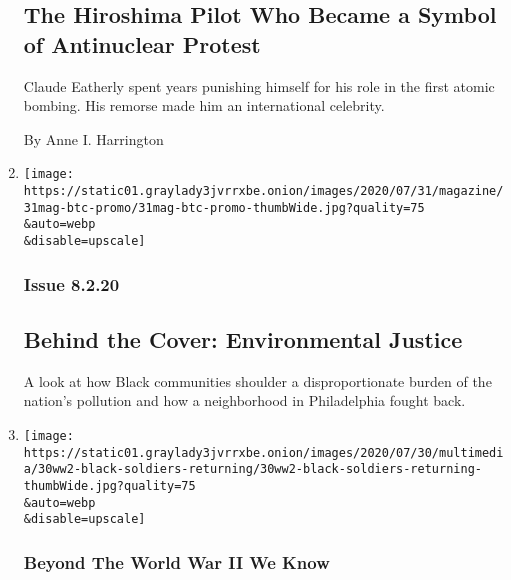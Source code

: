 \begin{enumerate}
  \hypertarget{the-hiroshima-pilot-who-became-a-symbol-of-antinuclear-protest}{%
  \subsection{The Hiroshima Pilot Who Became a Symbol of Antinuclear
  Protest}\label{the-hiroshima-pilot-who-became-a-symbol-of-antinuclear-protest}}

  Claude Eatherly spent years punishing himself for his role in the
  first atomic bombing. His remorse made him an international celebrity.

  By Anne I. Harrington
\item
  \href{/2020/07/31/magazine/behind-the-cover-environmental-justice.html}{}

  \texttt{[image: https://static01.graylady3jvrrxbe.onion/images/2020/07/31/magazine/31mag-btc-promo/31mag-btc-promo-thumbWide.jpg?quality=75\\\&auto=webp\\\&disable=upscale]}

  \hypertarget{issue-8220}{%
  \subsubsection{Issue 8.2.20}\label{issue-8220}}

  \hypertarget{behind-the-cover-environmental-justice}{%
  \subsection{Behind the Cover: Environmental
  Justice}\label{behind-the-cover-environmental-justice}}

  A look at how Black communities shoulder a disproportionate burden of
  the nation's pollution and how a neighborhood in Philadelphia fought
  back.
\item
  \href{/2020/07/30/magazine/black-soldiers-wwii-racism.html}{}

  \texttt{[image: https://static01.graylady3jvrrxbe.onion/images/2020/07/30/multimedia/30ww2-black-soldiers-returning/30ww2-black-soldiers-returning-thumbWide.jpg?quality=75\\\&auto=webp\\\&disable=upscale]}

  \hypertarget{beyond-the-world-war-ii-we-know-2}{%
  \subsubsection{Beyond The World War II We
  Know}\label{beyond-the-world-war-ii-we-know-2}}

  \hypertarget{returning-from-war-returning-to-racism}{%
}
\end{enumerate}
